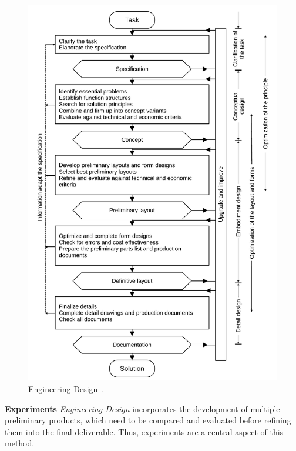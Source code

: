 \begin{figure}[htbp]
  \centering
  \includegraphics[width=\linewidth]{images/2_methodology/design_process}
  \caption[Engineering Design.]{Engineering Design~\cite{Dym2012,Pahl1984}.}
  \label{fig:engineering_design}
\end{figure}

\textbf{Experiments} \emph{Engineering Design} incorporates the development of
multiple preliminary products, which need to be compared and evaluated before refining
them into the final deliverable. Thus, experiments are a central aspect of this method.


